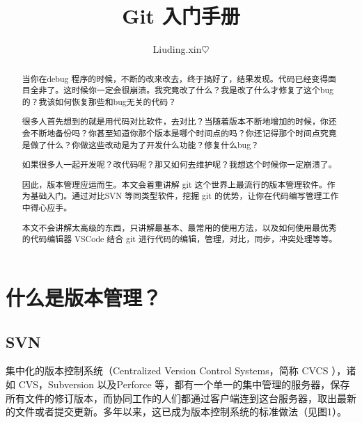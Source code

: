 \documentclass[UTF8,AutoFakeBold]{ctexart}
\begin{document}
\title{Git 入门手册}
\author{Liuding.xin$\heartsuit$}

\begin{titlepage}
    \maketitle
\end{titlepage}


\tableofcontents
\listoffigures
\listoftables
\clearpage

\begin{abstract}
    当你在debug 程序的时候，不断的改来改去，终于搞好了，结果发现。代码已经变得面目全非了。这时候你一定会很崩溃。我究竟改了什么？我是改了什么才修复了这个bug的？我该如何恢复那些和bug无关的代码？

    很多人首先想到的就是用代码对比软件，去对比？当随着版本不断地增加的时候，你还会不断地备份吗？你甚至知道你那个版本是哪个时间点的吗？你还记得那个时间点究竟是做了什么？你做这些改动是为了开发什么功能？修复什么bug？

    如果很多人一起开发呢？改代码呢？那又如何去维护呢？我想这个时候你一定崩溃了。

    因此，版本管理应运而生。本文会着重讲解 git 这个世界上最流行的版本管理软件。作为基础入门。通过对比SVN 等同类型软件，挖掘 git 的优势，让你在代码编写管理工作中得心应手。

    本文不会讲解太高级的东西，只讲解最基本、最常用的使用方法，以及如何使用最优秀的代码编辑器 VSCode 结合 git 进行代码的编辑，管理，对比，同步，冲突处理等等。

\end{abstract}

\newpage
\section{什么是版本管理？}
\subsection{SVN} %
\label{sub:SVN}

集中化的版本控制系统（Centralized Version Control Systems，简称 CVCS ），诸如 CVS，Subversion 以及Perforce 等，都有一个单一的集中管理的服务器，保存所有文件的修订版本，而协同工作的人们都通过客户端连到这台服务器，取出最新的文件或者提交更新。多年以来，这已成为版本控制系统的标准做法（见图1）。
\end{document}
